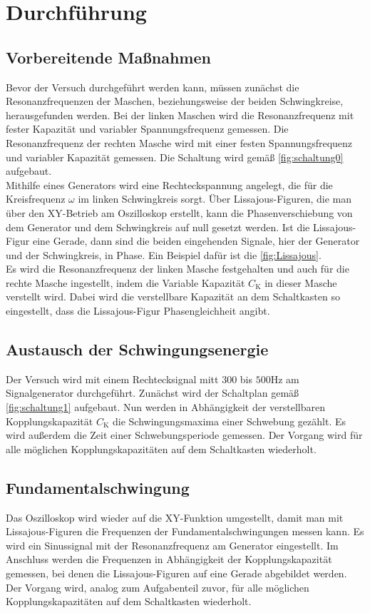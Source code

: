 \section{Durchführung}
\label{sec:Durchführung}

\subsection{Vorbereitende Maßnahmen}
Bevor der Versuch durchgeführt werden kann, müssen zunächst die Resonanzfrequenzen der Maschen, beziehungsweise der beiden Schwingkreise,
herausgefunden werden.
Bei der linken Maschen wird die Resonanzfrequenz mit fester Kapazität und variabler Spannungsfrequenz %
gemessen. Die Resonanzfrequenz der rechten Masche wird mit einer festen Spannungsfrequenz und variabler Kapazität  gemessen.
Die Schaltung wird gemäß \autoref{fig:schaltung0} aufgebaut.
\\
Mithilfe eines Generators wird eine Rechteckspannung angelegt, die  für die Kreisfrequenz $\omega$ im linken Schwingkreis sorgt. 
Über Lissajous-Figuren, die man über den XY-Betrieb am Oszilloskop erstellt, kann die Phasenverschiebung von dem Generator und 
dem Schwingkreis auf null gesetzt werden. Ist die Lissajous-Figur eine Gerade, dann sind die beiden eingehenden Signale, hier der
Generator und der Schwingkreis, in Phase. Ein Beispiel dafür ist die \autoref{fig:Lissajous}.
\\
Es wird die Resonanzfrequenz der linken Masche festgehalten und auch für die rechte Masche ingestellt, indem die Variable Kapazität
$C_{\text{K}}$ in dieser Masche verstellt wird.
Dabei wird die verstellbare Kapazität an dem Schaltkasten so eingestellt, dass die Lissajous-Figur Phasengleichheit angibt.

\subsection{Austausch der Schwingungsenergie}
Der Versuch wird mit einem Rechtecksignal mitt $300$ bis $500 \si{\hertz}$ am Signalgenerator durchgeführt.
Zunächst wird der Schaltplan gemäß \autoref{fig:schaltung1} aufgebaut. Nun werden in Abhängigkeit der verstellbaren Kopplungskapazität $C_{\text{K}}$ die 
Schwingungsmaxima einer Schwebung gezählt. Es wird außerdem die Zeit einer Schwebungsperiode gemessen.
Der Vorgang wird für alle möglichen Kopplungskapazitäten auf dem Schaltkasten wiederholt.

\subsection{Fundamentalschwingung}
Das Oszilloskop wird wieder auf die XY-Funktion umgestellt, damit man mit Lissajous-Figuren die Frequenzen der Fundamentalschwingungen messen kann. 
Es wird ein Sinussignal mit der Resonanzfrequenz am Generator eingestellt. Im Anschluss werden die Frequenzen in Abhängigkeit der Kopplungskapazität 
gemessen, bei denen die Lissajous-Figuren auf eine Gerade abgebildet werden. Der Vorgang wird, analog zum Aufgabenteil zuvor, für alle möglichen 
Kopplungskapazitäten auf dem Schaltkasten wiederholt. 

